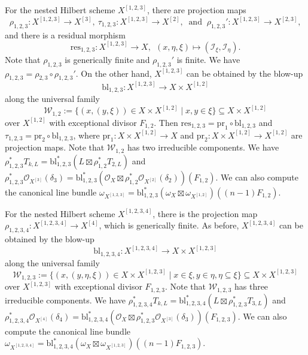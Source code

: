 \documentclass{amsart}
\theoremstyle{plain}
\theoremstyle{definition}
\theoremstyle{remark}
\newcommand{\res}{\textrm{res}}
\newcommand{\bl}{\textrm{bl}}
\newcommand{\pr}{\textrm{pr}}
\begin{document}
For the nested Hilbert scheme $X^{[1,2,3]}$, there are projection maps
$$
\rho_{1,2,3} \colon X^{[1,2,3]} \longrightarrow X^{[3]},~\tau_{1,2,3} \colon X^{[1,2,3]} \longrightarrow X^{[2]},~\text{ and }~ \rho_{1,2,3}' \colon X^{[1,2,3]} \longrightarrow X^{[2,3]},
$$
and there is a residual morphism
$$
\res_{1,2,3} \colon X^{[1,2,3]} \longrightarrow X,~~(x, \eta, \xi) \longmapsto (\mathscr{I}_{\xi}, \mathscr{I}_{\eta}). 
$$
Note that $\rho_{1,2,3}$ is generically finite and $\rho_{1,2,3}'$ is finite. We have $\rho_{1,2,3} = \rho_{2,3} \circ \rho_{1,2,3}'$. On the other hand, $X^{[1,2,3]}$ can be obtained by the blow-up
$$
\bl_{1,2,3} \colon X^{[1,2,3]} \longrightarrow X \times X^{[1,2]}
$$
along the universal family 
$$
\mathcal{W}_{1,2}:= \{ (x, (y, \xi)) \in X \times X^{[1,2]} \mid x,y \in \xi\} \subseteq X \times X^{[1,2]}
$$
over $X^{[1,2]}$ with exceptional divisor $F_{1,2}$. Then $\res_{1,2,3} = \pr_1 \circ \bl_{1,2,3}$ and $\tau_{1,2,3} = \pr_2 \circ \bl_{1,2,3}$, where $\pr_1 \colon X \times X^{[1,2]} \to X$ and $\pr_2 \colon X \times X^{[1,2]} \to X^{[1,2]}$ are projection maps. Note that $\mathcal{W}_{1,2}$ has two irreducible components. We have $\rho_{1,2,3}^* T_{k,L} = \bl_{1,2,3}^* (L \boxtimes \rho_{1,2}^* T_{2,L})$ and $\rho_{1,2,3}^* \mathcal{O}_{X^{[3]}}(\delta_3) = \bl_{1,2,3}^* (\mathcal{O}_X \boxtimes \rho_{1,2}^* \mathcal{O}_{X^{[2]}}(\delta_2)) (F_{1,2})$. We can also compute the canonical line bundle
$\omega_{X^{[1,2,3]}} = \bl_{1,2,3}^* (\omega_X \boxtimes \omega_{X^{[1,2]}}) ((n-1)F_{1,2})$.

\medskip

For the nested Hilbert scheme $X^{[1,2,3,4]}$, there is the projection map $\rho_{1,2,3,4} \colon X^{[1,2,3,4]} \to X^{[4]}$, which is generically finite. As before, $X^{[1,2,3,4]}$ can be obtained by the blow-up
$$
\bl_{1,2,3,4} \colon X^{[1,2,3,4]} \longrightarrow X \times X^{[1,2,3]}
$$
along the universal family
$$
\mathcal{W}_{1,2,3}:= \{ (x, (y,\eta, \xi)) \in X \times X^{[1,2,3]} \mid x \in \xi, y \in \eta, \eta \subseteq \xi\} \subseteq X \times X^{[1,2,3]}
$$
over $X^{[1,2,3]}$ with exceptional divisor $F_{1,2,3}$. Note that $\mathcal{W}_{1,2,3}$ has three irreducible components. We have $\rho_{1,2,3,4}^* T_{k,L} = \bl_{1,2,3,4}^* (L \boxtimes \rho_{1,2,3}^* T_{3,L})$ and $\rho_{1,2,3,4}^* \mathcal{O}_{X^{[4]}}(\delta_4) = \bl_{1,2,3,4}^* (\mathcal{O}_X \boxtimes \rho_{1,2,3}^* \mathcal{O}_{X^{[3]}}(\delta_3))(F_{1,2,3})$. We can also compute the canonical line bundle
$\omega_{X^{[1,2,3,4]}} = \bl_{1,2,3,4}^* (\omega_X \boxtimes \omega_{X^{[1,2,3]}}) ((n-1)F_{1,2,3})$.
\end{document}
